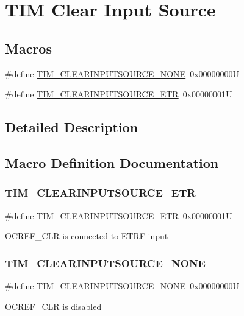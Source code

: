 \hypertarget{group___t_i_m___clear_input___source}{}\section{T\+IM Clear Input Source}
\label{group___t_i_m___clear_input___source}
\subsection*{Macros}
\begin{DoxyCompactItemize}
\item 
\#define \mbox{\hyperlink{group___t_i_m___clear_input___source_ga48c5312aecd377fab00d62e9b4169e9e}{T\+I\+M\+\_\+\+C\+L\+E\+A\+R\+I\+N\+P\+U\+T\+S\+O\+U\+R\+C\+E\+\_\+\+N\+O\+NE}}~0x00000000U
\item 
\#define \mbox{\hyperlink{group___t_i_m___clear_input___source_gaa28a8cf1db85cf6c845c6c1f02ba5c8e}{T\+I\+M\+\_\+\+C\+L\+E\+A\+R\+I\+N\+P\+U\+T\+S\+O\+U\+R\+C\+E\+\_\+\+E\+TR}}~0x00000001U
\end{DoxyCompactItemize}


\subsection{Detailed Description}


\subsection{Macro Definition Documentation}
\mbox{\label{group___t_i_m___clear_input___source_gaa28a8cf1db85cf6c845c6c1f02ba5c8e}} 
\subsubsection{\texorpdfstring{TIM\_CLEARINPUTSOURCE\_ETR}{TIM\_CLEARINPUTSOURCE\_ETR}}
{\footnotesize\ttfamily \#define T\+I\+M\+\_\+\+C\+L\+E\+A\+R\+I\+N\+P\+U\+T\+S\+O\+U\+R\+C\+E\+\_\+\+E\+TR~0x00000001U}

O\+C\+R\+E\+F\+\_\+\+C\+LR is connected to E\+T\+RF input \mbox{\label{group___t_i_m___clear_input___source_ga48c5312aecd377fab00d62e9b4169e9e}} 
\subsubsection{\texorpdfstring{TIM\_CLEARINPUTSOURCE\_NONE}{TIM\_CLEARINPUTSOURCE\_NONE}}
{\footnotesize\ttfamily \#define T\+I\+M\+\_\+\+C\+L\+E\+A\+R\+I\+N\+P\+U\+T\+S\+O\+U\+R\+C\+E\+\_\+\+N\+O\+NE~0x00000000U}

O\+C\+R\+E\+F\+\_\+\+C\+LR is disabled 